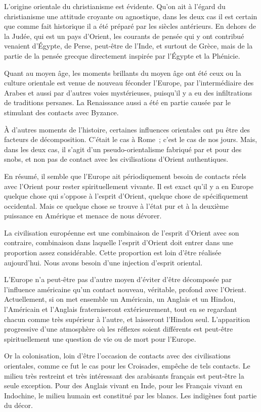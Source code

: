 \documentclass[french,twoside]{book} %
\begin{document}
L'origine orientale du christianisme est évidente. Qu'on ait à l'égard du christianisme une attitude croyante ou agnostique, dans les deux cas il est certain que comme fait historique il a été préparé par les siècles antérieurs. En dehors de la Judée, qui est un pays d'Orient, les courants de pensée qui y ont contribué venaient d'Égypte, de Perse, peut-être de l'Inde, et surtout de Grèce, mais de la partie de la pensée grecque directement inspirée par l'Égypte et la Phénicie.\par
Quant au moyen âge, les moments brillants du moyen âge ont été ceux ou la culture orientale est venue de nouveau féconder l'Europe, par l'intermédiaire des Arabes et aussi par d'autres voies mystérieuses, puisqu'il y a eu des infiltrations de traditions persanes. La Renaissance aussi a été en partie causée par le stimulant des contacts avec Byzance.\par
À d'autres moments de l'histoire, certaines influences orientales ont pu être des facteurs de décomposition. C'était le cas à Rome ; c'est le cas de nos jours. Mais, dans les deux cas, il s'agit d'un pseudo-orientalisme fabriqué par et pour des snobs, et non pas de contact avec les civilisations d'Orient authentiques.\par
En résumé, il semble que l'Europe ait périodiquement besoin de contacts réels avec l'Orient pour rester spirituellement vivante. Il est exact qu'il y a en Europe quelque chose qui s'oppose à l'esprit d'Orient, quelque chose de spécifiquement occidental. Mais ce quelque chose se trouve à l'état pur et à la deuxième puissance en Amérique et menace de nous dévorer.\par
La civilisation européenne est une combinaison de l'esprit d'Orient avec son contraire, combinaison dans laquelle l'esprit d'Orient doit entrer dans une proportion assez considérable. Cette proportion est loin d'être réalisée aujourd'hui. Nous avons besoin d'une injection d'esprit oriental.\par
L'Europe n'a peut-être pas d'autre moyen d'éviter d'être décomposée par l'influence américaine qu'un contact nouveau, véritable, profond avec l'Orient. Actuellement, si on met ensemble un Américain, un Anglais et un Hindou, l'Américain et l'Anglais fraterniseront extérieurement, tout en se regardant chacun comme très supérieur à l'autre, et laisseront l'Hindou seul. L'apparition progressive d'une atmosphère où les réflexes soient différents est peut-être spirituellement une question de vie ou de mort pour l'Europe.\par
Or la colonisation, loin d'être l'occasion de contacts avec des civilisations orientales, comme ce fut le cas pour les Croisades, empêche de tels contacts. Le milieu très restreint et très intéressant des arabisants français est peut-être la seule exception. Pour des Anglais vivant en Inde, pour les Français vivant en Indochine, le milieu humain est constitué par les blancs. Les indigènes font partie du décor.\par
\end{document}
